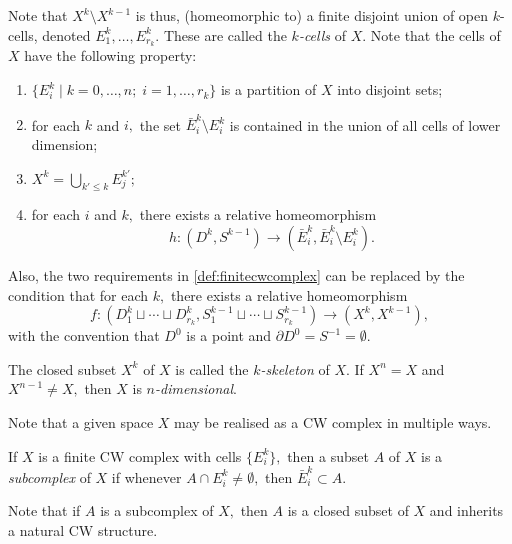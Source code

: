 \documentclass[12pt]{article}
\begin{document}
Note that $X^k\setminus X^{k-1}$ is thus, (homeomorphic to) a finite disjoint union of open $k$-cells, denoted $E_1^k, \ldots, E_{r_k}^k.$ These are called the \emph{$k$-cells} of $X.$ Note that the cells of $X$ have the following property:
\begin{enumerate}
	\item $\{E_i^k \mid k = 0, \ldots, n;\; i = 1, \ldots, r_k\}$ is a partition of $X$ into disjoint sets;
	\item for each $k$ and $i,$ the set $\bar{E}_i^k\setminus E_i^k$ is contained in the union of all cells of lower dimension;
	\item $X^k = \bigcup_{k' \le k}E_j^{k'};$
	\item for each $i$ and $k,$ there exists a relative homeomorphism
	\begin{equation*} 
		h:(D^k, S^{k-1}) \to (\bar{E}_i^k, \bar{E}_i^k\setminus E_i^k).
	\end{equation*}
\end{enumerate} 

Also, the two requirements in \cref{def:finitecwcomplex} can be replaced by the condition that for each $k,$ there exists a relative homeomorphism
\begin{equation*} 
	f:(D_1^k \sqcup \cdots \sqcup D_{r_k}^k, S_1^{k-1} \sqcup \cdots \sqcup S_{r_k}^{k-1}) \to (X^k, X^{k-1}),
\end{equation*}
with the convention that $D^0$ is a point and $\partial D^0 = S^{-1} = \emptyset.$

\begin{defn}		
	The closed subset $X^k$ of $X$ is called the \emph{$k$-skeleton} of $X.$ If $X^n = X$ and $X^{n-1} \neq X,$ then $X$ is \emph{$n$-dimensional}.
\end{defn}	
Note that a given space $X$ may be realised as a CW complex in multiple ways.

\begin{defn}[Subcomplex]
	If $X$ is a finite CW complex with cells $\{E_i^k\},$ then a subset $A$ of $X$ is a \emph{subcomplex} of $X$ if whenever $A \cap E_i^k \neq \emptyset,$ then $\bar{E}_i^k \subset A.$
\end{defn}
Note that if $A$ is a subcomplex of $X,$ then $A$ is a closed subset of $X$ and inherits a natural CW structure.
\end{document}
